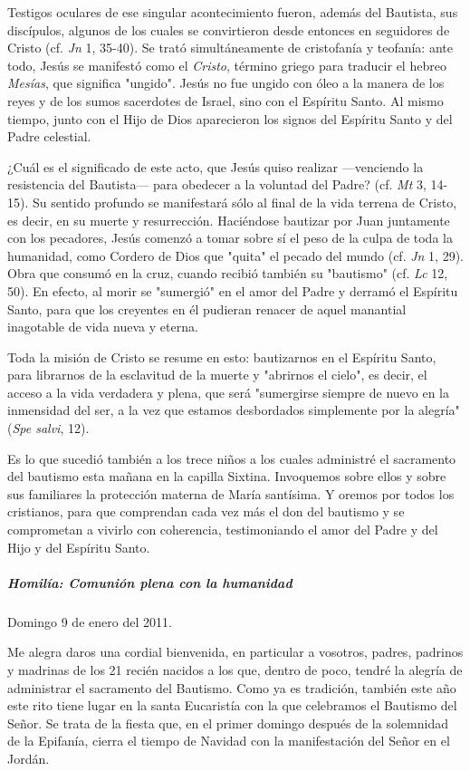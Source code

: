 \documentclass[]{article}
\let\oldsubparagraph\subparagraph
\renewcommand{\subparagraph}[1]{\oldsubparagraph{#1}\mbox{}}
\begin{document}
Testigos oculares de ese singular acontecimiento fueron, además del
Bautista, sus discípulos, algunos de los cuales se convirtieron desde
entonces en seguidores de Cristo (cf. \emph{Jn} 1, 35-40). Se trató
simultáneamente de cristofanía y teofanía: ante todo, Jesús se manifestó
como el \emph{Cristo}, término griego para traducir el hebreo
\emph{Mesías}, que significa "ungido". Jesús no fue ungido con óleo a la
manera de los reyes y de los sumos sacerdotes de Israel, sino con el
Espíritu Santo. Al mismo tiempo, junto con el Hijo de Dios aparecieron
los signos del Espíritu Santo y del Padre celestial.

¿Cuál es el significado de este acto, que Jesús quiso realizar
---venciendo la resistencia del Bautista--- para obedecer a la voluntad
del Padre? (cf. \emph{Mt} 3, 14-15). Su sentido profundo se manifestará
sólo al final de la vida terrena de Cristo, es decir, en su muerte y
resurrección. Haciéndose bautizar por Juan juntamente con los pecadores,
Jesús comenzó a tomar sobre sí el peso de la culpa de toda la humanidad,
como Cordero de Dios que "quita" el pecado del mundo (cf. \emph{Jn} 1,
29). Obra que consumó en la cruz, cuando recibió también su "bautismo"
(cf. \emph{Lc} 12, 50). En efecto, al morir se "sumergió" en el amor del
Padre y derramó el Espíritu Santo, para que los creyentes en él pudieran
renacer de aquel manantial inagotable de vida nueva y eterna.

Toda la misión de Cristo se resume en esto: bautizarnos en el Espíritu
Santo, para librarnos de la esclavitud de la muerte y "abrirnos el
cielo", es decir, el acceso a la vida verdadera y plena, que será
"sumergirse siempre de nuevo en la inmensidad del ser, a la vez que
estamos desbordados simplemente por la alegría" (\emph{Spe salvi}, 12).

Es lo que sucedió también a los trece niños a los cuales administré el
sacramento del bautismo esta mañana en la capilla Sixtina. Invoquemos
sobre ellos y sobre sus familiares la protección materna de María
santísima. Y oremos por todos los cristianos, para que comprendan cada
vez más el don del bautismo y se comprometan a vivirlo con coherencia,
testimoniando el amor del Padre y del Hijo y del Espíritu Santo.

\subparagraph{Homilía: Comunión plena con la
humanidad}\label{homiluxeda-comuniuxf3n-plena-con-la-humanidad}

Domingo 9 de enero del 2011.

Me alegra daros una cordial bienvenida, en particular a vosotros,
padres, padrinos y madrinas de los 21 recién nacidos a los que, dentro
de poco, tendré la alegría de administrar el sacramento del Bautismo.
Como ya es tradición, también este año este rito tiene lugar en la santa
Eucaristía con la que celebramos el Bautismo del Señor. Se trata de la
fiesta que, en el primer domingo después de la solemnidad de la
Epifanía, cierra el tiempo de Navidad con la manifestación del Señor en
el Jordán.
\end{document}
